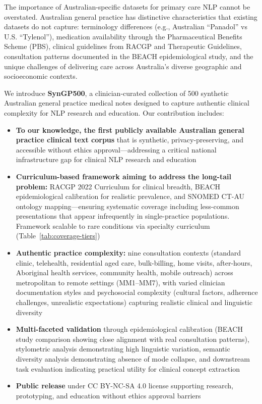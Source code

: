 \documentclass[11pt]{article}
\begin{document}
The importance of Australian-specific datasets for primary care NLP cannot be overstated. Australian general practice has distinctive characteristics that existing datasets do not capture: terminology differences (e.g., Australian ``Panadol'' vs U.S. ``Tylenol''), medication availability through the Pharmaceutical Benefits Scheme (PBS), clinical guidelines from RACGP and Therapeutic Guidelines, consultation patterns documented in the BEACH epidemiological study, and the unique challenges of delivering care across Australia's diverse geographic and socioeconomic contexts.

We introduce \textbf{SynGP500}, a clinician-curated collection of 500 synthetic Australian general practice medical notes designed to capture authentic clinical complexity for NLP research and education. Our contribution includes:

\begin{itemize}[noitemsep]
    \item \textbf{To our knowledge, the first publicly available Australian general practice clinical text corpus} that is synthetic, privacy-preserving, and accessible without ethics approval—addressing a critical national infrastructure gap for clinical NLP research and education
    \item \textbf{Curriculum-based framework aiming to address the long-tail problem:} RACGP 2022 Curriculum for clinical breadth, BEACH epidemiological calibration for realistic prevalence, and SNOMED CT-AU ontology mapping—ensuring systematic coverage including less-common presentations that appear infrequently in single-practice populations. Framework scalable to rare conditions via specialty curriculum (Table~\ref{tab:coverage-tiers})
    \item \textbf{Authentic practice complexity:} nine consultation contexts (standard clinic, telehealth, residential aged care, bulk-billing, home visits, after-hours, Aboriginal health services, community health, mobile outreach) across metropolitan to remote settings (MM1--MM7), with varied clinician documentation styles and psychosocial complexity (cultural factors, adherence challenges, unrealistic expectations) capturing realistic clinical and linguistic diversity
    \item \textbf{Multi-faceted validation} through epidemiological calibration (BEACH study comparison showing close alignment with real consultation patterns), stylometric analysis demonstrating high linguistic variation, semantic diversity analysis demonstrating absence of mode collapse, and downstream task evaluation indicating practical utility for clinical concept extraction
    \item \textbf{Public release} under CC BY-NC-SA 4.0 license supporting research, prototyping, and education without ethics approval barriers
\end{itemize}
\end{document}

